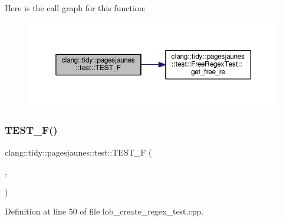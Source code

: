 Here is the call graph for this function\+:
\nopagebreak
\begin{figure}[H]
\begin{center}
\leavevmode
\includegraphics[width=350pt]{namespaceclang_1_1tidy_1_1pagesjaunes_1_1test_a8fbe104b8e3e27f949ce5b93f523dd05_cgraph}
\end{center}
\end{figure}
\mbox{\label{namespaceclang_1_1tidy_1_1pagesjaunes_1_1test_a323364914c7bbb949edba7c8e6080598}} 
\subsubsection{\texorpdfstring{T\+E\+S\+T\+\_\+\+F()}{TEST\_F()}\hspace{0.1cm}{\footnotesize\ttfamily [12/57]}}
{\footnotesize\ttfamily clang\+::tidy\+::pagesjaunes\+::test\+::\+T\+E\+S\+T\+\_\+F (\begin{DoxyParamCaption}\item[{\hyperlink{classclang_1_1tidy_1_1pagesjaunes_1_1test_1_1_lob_create_regex_test}{Lob\+Create\+Regex\+Test}}]{,  }\item[{Regex\+Matching\+Indicators}]{ }\end{DoxyParamCaption})}



Definition at line 50 of file lob\+\_\+create\+\_\+regex\+\_\+test.\+cpp.

